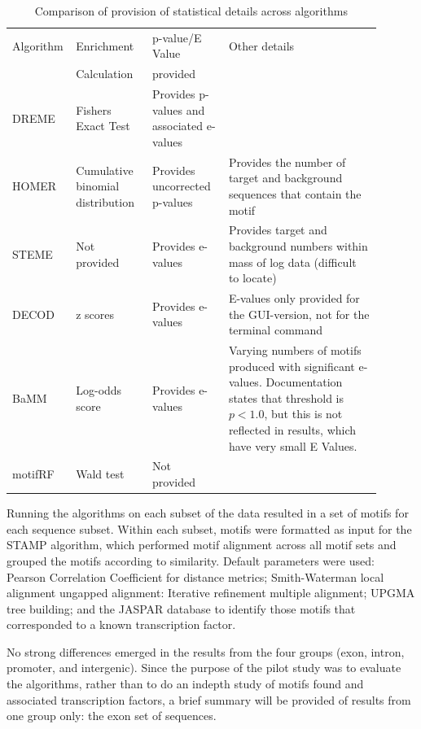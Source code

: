 \documentclass[12pt]{article}
\begin{document}
\begin{table}[!ht]
\centering
\caption{Comparison of provision of statistical details across algorithms}\label{statisticaldetails}
\begin{tabular}{| p{0.1\linewidth} |  p{0.2\linewidth} |  p{0.2\linewidth} |  p{0.4\linewidth} |}
\hline
Algorithm & Enrichment & p-value/E Value & Other details\\
& Calculation & provided &\\ 
\hline
DREME & Fishers Exact Test & Provides p-values and associated e-values &\\
\hline
HOMER & Cumulative binomial distribution & Provides uncorrected p-values & Provides the number of target and background sequences that contain the motif\\
\hline
STEME & Not provided & Provides e-values & Provides target and background numbers within mass of log data (difficult to locate)\\
\hline
DECOD & z scores & Provides e-values & E-values only provided for the GUI-version, not for the terminal command\\
\hline
BaMM & Log-odds score & Provides e-values & Varying numbers of motifs produced with significant e-values. Documentation states that threshold is $p<1.0$, but this is not reflected in results, which have very small E Values.\\
\hline
motifRF & Wald test & Not provided &\\
\hline


\end{tabular}
\end{table} 


Running the algorithms on each subset of the data resulted in a set of motifs for each sequence subset. Within each subset, motifs were formatted as input for the STAMP algorithm, which performed motif alignment across all motif sets and grouped the motifs according to similarity. Default parameters were used: Pearson Correlation Coefficient for distance metrics; Smith-Waterman local alignment ungapped alignment: Iterative refinement multiple alignment; UPGMA tree building; and the JASPAR database \citep{sandelin2004jaspar} to identify those motifs that corresponded to a known transcription factor.  

No strong differences emerged in the results from the four groups (exon, intron, promoter, and intergenic). Since the purpose of the pilot study was to evaluate the algorithms, rather than to do an indepth study of motifs found and associated transcription factors, a brief summary will be provided of results from one group only: the exon set of sequences. 
\end{document}
